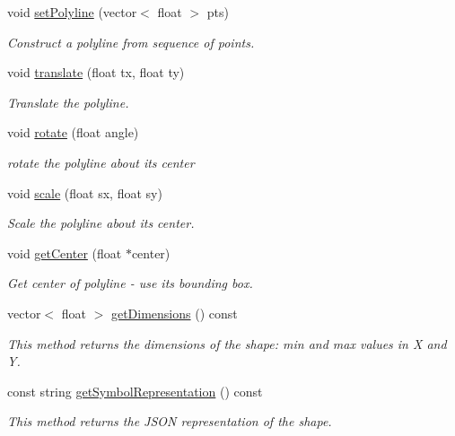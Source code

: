 \begin{DoxyCompactItemize}
void \hyperlink{classbridges_1_1datastructure_1_1_polyline_ab1fb850dabd3ed58fd4f916992a0b9a6}{set\+Polyline} (vector$<$ float $>$ pts)
\begin{DoxyCompactList}\small\item\em Construct a polyline from sequence of points. \end{DoxyCompactList}\item 
void \hyperlink{classbridges_1_1datastructure_1_1_polyline_a0b651b1c383b228f8d473232e64e4bda}{translate} (float tx, float ty)
\begin{DoxyCompactList}\small\item\em Translate the polyline. \end{DoxyCompactList}\item 
void \hyperlink{classbridges_1_1datastructure_1_1_polyline_aa61978ccbb0b086dc8f55e90ccca23c9}{rotate} (float angle)
\begin{DoxyCompactList}\small\item\em rotate the polyline about its center \end{DoxyCompactList}\item 
void \hyperlink{classbridges_1_1datastructure_1_1_polyline_adf06f484d9a48960de84ed3646903f3a}{scale} (float sx, float sy)
\begin{DoxyCompactList}\small\item\em Scale the polyline about its center. \end{DoxyCompactList}\item 
void \hyperlink{classbridges_1_1datastructure_1_1_polyline_ad0783deb77873eda19528681bbbca25c}{get\+Center} (float $\ast$center)
\begin{DoxyCompactList}\small\item\em Get center of polyline -\/ use its bounding box. \end{DoxyCompactList}\item 
vector$<$ float $>$ \hyperlink{classbridges_1_1datastructure_1_1_polyline_aefa5c986d003c9bde234e230a6bd8bd8}{get\+Dimensions} () const
\begin{DoxyCompactList}\small\item\em This method returns the dimensions of the shape\+: min and max values in X and Y. \end{DoxyCompactList}\item 
const string \hyperlink{classbridges_1_1datastructure_1_1_polyline_a176c06400a3b105fa651c69891381201}{get\+Symbol\+Representation} () const
\begin{DoxyCompactList}\small\item\em This method returns the J\+S\+ON representation of the shape. \end{DoxyCompactList}\end{DoxyCompactItemize}
